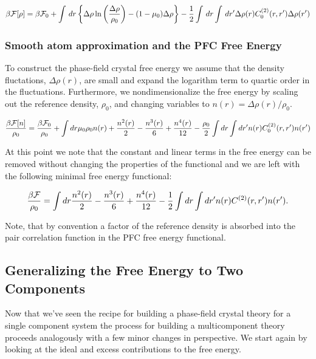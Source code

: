 \begin{equation}
    \beta\mathcal{F}[\rho] = \beta\mathcal{F}_0 + \int\,dr \left\lbrace \Delta\rho \ln\left(\frac{\Delta\rho}{\rho_0}\right) - (1 - \mu_0)\Delta\rho \right\rbrace
    - \frac{1}{2}\int\,dr\int\,dr^\prime \Delta\rho(r) C^{(2)}_0(r, r^\prime) \Delta\rho(r^\prime)
\end{equation}

\subsubsection{Smooth atom approximation and the PFC Free Energy}

To construct the phase-field crystal free energy we assume that the density fluctations, $\Delta\rho(r)$, are small and expand the logarithm term to quartic order in the fluctuations.
Furthermore, we nondimensionalize the free energy by scaling out the reference density, $\rho_0$, and changing variables to $n(r) = \Delta\rho(r)/\rho_0$.

\begin{equation}
    \frac{\beta\mathcal{F}[n]}{\rho_0} = \frac{\beta\mathcal{F}_0}{\rho_0} +
    \int dr \mu_0 \rho_0 n(r) + \frac{n^2(r)}{2} - \frac{n^3(r)}{6} + \frac{n^4(r)}{12}
    -\frac{\rho_0}{2} \int dr \int dr^\prime n(r) C^{(2)}_0(r, r^\prime) n(r^\prime)
\end{equation}

At this point we note that the constant and linear terms in the free energy can be removed without changing the properties of the functional and we are left with the following minimal free energy functional:

\begin{equation}
    \frac{\beta\mathcal{F}}{\rho_0} = \int dr \frac{n^2(r)}{2} - \frac{n^3(r)}{6} + \frac{n^4(r)}{12}
    -\frac{1}{2} \int dr \int dr^\prime n(r) C^{(2)}(r, r^\prime) n(r^\prime).
\end{equation}

Note, that by convention a factor of the reference density is absorbed into the pair correlation function in the PFC free energy functional.

\subsection{Generalizing the Free Energy to Two Components}
Now that we've seen the recipe for building a phase-field crystal theory for a single component system the process for building a multicomponent theory proceeds analogously with a few minor changes in perspective.
We start again by looking at the ideal and excess contributions to the free energy.

